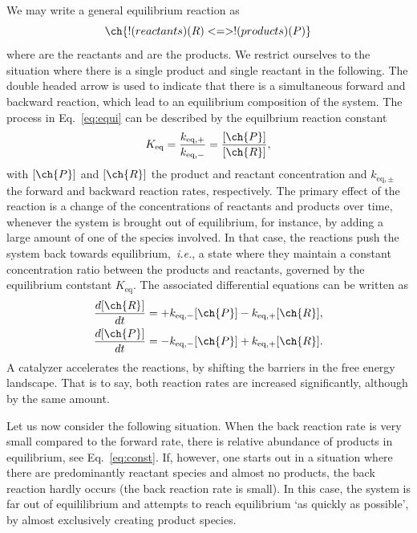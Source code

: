 \documentclass[aip,jcp,reprint,a4paper,onecolumn,nofootinbib,amsmath,amssymb]{revtex4-1}
\begin{document}
We may write a general equilibrium reaction as
\begin{equation}
  \label{eq:equi}
  \ch{!(reactants)(R) <=> !(products)(P)}
\end{equation}
where  are the reactants and  are the products. We restrict ourselves to the situation where there is a single product and single reactant in the following. The double headed arrow is used to indicate that there is a simultaneous forward and backward reaction, which lead to an equilibrium composition of the system. The process in Eq.~\eqref{eq:equi} can be described by the equilbrium reaction constant
\begin{equation}
  \label{eq:const}
  K_{\text{eq}} = \frac{k_{\text{eq},+}}{k_{\text{eq},-}} = \frac{[\ch{P}]}{[\ch{R}]} ,
\end{equation}
with $[\ch{P}]$ and $[\ch{R}]$ the product and reactant concentration and $k_{\textrm{eq},\pm}$ the forward and backward reaction rates, respectively. The primary effect of the reaction is a change of the concentrations of reactants and products over time, whenever the system is brought out of equilibrium, for instance, by adding a large amount of one of the species involved. In that case, the reactions push the system back towards equilibrium,~\textit{i.e.}, a state where they maintain a constant concentration ratio between the products and reactants, governed by the equilibrium contstant $K_{\text{eq}}$. The associated differential equations can be written as
\begin{subequations}
  \label{eq:diff}
  \begin{align}
    \label{eq:diff-equi-a}
    \frac{d[\ch{R}]}{dt} &= + k_{\text{eq},-}[\ch{P}] - k_{\text{eq},+}[\ch{R}] , \\
    \label{eq:diff-equi-b}
    \frac{d[\ch{P}]}{dt} &= - k_{\text{eq},-}[\ch{P}] + k_{\text{eq},+}[\ch{R}] .
  \end{align}
\end{subequations}
A catalyzer accelerates the reactions, by shifting the barriers in the free energy landscape. That is to say, both reaction rates are increased significantly, although by the same amount. 

Let us now consider the following situation. When the back reaction rate is very small compared to the forward rate, there is relative abundance of products in equilibrium, see Eq.~\eqref{eq:const}. If, however, one starts out in a situation where there are predominantly reactant species and almost no products, the back reaction hardly occurs (the back reaction rate is small). In this case, the system is far out of equililibrium and attempts to reach equilibrium `as quickly as possible', by almost exclusively creating product species. 
\end{document}
